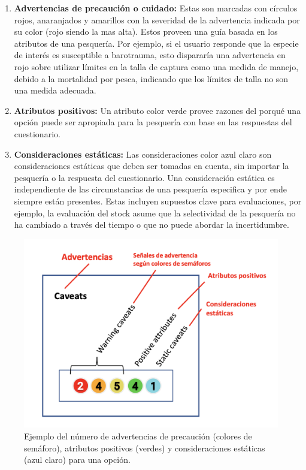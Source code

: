 \documentclass[
  11pt,
]{book}
\providecommand{\tightlist}{%
  \setlength{\itemsep}{0pt}\setlength{\parskip}{0pt}}
\begin{document}
\begin{enumerate}
\def\labelenumi{\arabic{enumi}.}
\tightlist
\item
  \textbf{Advertencias de precaución o cuidado:} Estas son marcadas con círculos rojos, anaranjados y amarillos con la severidad de la advertencia indicada por su color (rojo siendo la mas alta). Estos proveen una guía basada en los atributos de una pesquería. Por ejemplo, si el usuario responde que la especie de interés es susceptible a barotrauma, esto dispararía una advertencia en rojo sobre utilizar límites en la talla de captura como una medida de manejo, debido a la mortalidad por pesca, indicando que los límites de talla no son una medida adecuada.
\item
  \textbf{Atributos positivos:} Un atributo color verde provee razones del porqué una opción puede ser apropiada para la pesquería con base en las respuestas del cuestionario.
\item
  \textbf{Consideraciones estáticas:} Las consideraciones color azul claro son consideraciones estáticas que deben ser tomadas en cuenta, sin importar la pesquería o la respuesta del cuestionario. Una consideración estática es independiente de las circunstancias de una pesquería especifica y por ende siempre están presentes. Estas incluyen supuestos clave para evaluaciones, por ejemplo, la evaluación del stock asume que la selectividad de la pesquería no ha cambiado a través del tiempo o que no puede abordar la incertidumbre.
\end{enumerate}

\begin{figure}

{\centering \includegraphics[width=0.35\linewidth]{images/caveats-es} 

}

\caption{Ejemplo del número de advertencias de precaución (colores de semáforo), atributos positivos (verdes) y consideraciones estáticas (azul claro) para una opción.}\label{fig:caveats}
\end{figure}
\end{document}

